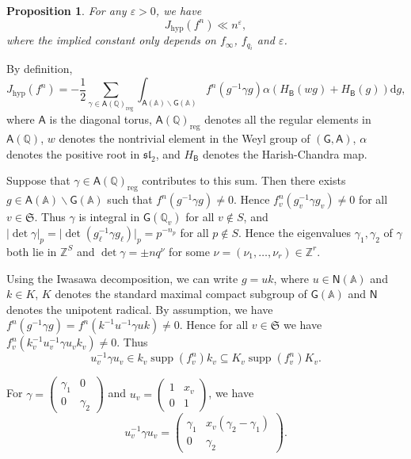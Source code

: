 \documentclass[10pt,oneside,reqno]{amsart}
\makeatletter
\newcommand\rmd{\mathrm{d}}
\renewcommand\AA{\mathbb{A}}
\newcommand\QQ{\mathbb{Q}}
\newcommand\ZZ{\mathbb{Z}}
\newcommand\mf[1]{\mathfrak{#1}}
\newcommand\A{\mathsf{A}}
\newcommand\B{\mathsf{B}}
\newcommand\G{\mathsf{G}}
\newcommand\N{\mathsf{N}}
\newcommand\bs{\backslash}
\DeclareMathOperator\supp{supp}
\newcommand\hyp{\mathrm{hyp}}
\newcommand\reg{\mathrm{reg}}
\theoremstyle{THEOREM}
\newtheorem{proposition}[theorem]{Proposition}
\theoremstyle{DEFINITION}
\theoremstyle{EXERCISE}
\numberwithin{equation}{section}
\renewenvironment{proof}[1][\proofname]{\par
  \vspace{-6pt}
  \pushQED{\qed}
  \normalfont \topsep6\p@\@plus6\p@\relax
  \trivlist
  \item[\hskip\labelsep\rmfamily\bfseries
    #1\@addpunct{:}]\ignorespaces
}{
  \popQED\endtrivlist\@endpefalse
  \vspace{-6pt}
}
\makeatother
\begin{document}
\begin{proposition}\label{prop:hypestimate}
For any $\varepsilon>0$, we have
\[
J_\hyp(f^n)\ll n^\varepsilon,
\]
where the implied constant only depends on $f_{\infty}$, $f_{q_i}$ and $\varepsilon$.
\end{proposition}
\begin{proof}
By definition, 
\[
J_\hyp(f^n)=-\frac{1}{2}\sum_{\gamma\in \A(\QQ)_{\reg}}\int_{\A(\AA)\bs \G(\AA)}f^n(g^{-1}\gamma g)\alpha(H_\B(wg)+H_\B(g))\rmd g,
\]
where $\A$ is the diagonal torus, $\A(\QQ)_\reg$ denotes all the regular elements in $\A(\QQ)$, $w$ denotes the nontrivial element in the Weyl group of $(\G,\A)$, $\alpha$ denotes the positive root in $\mf{sl}_2$, and $H_\B$ denotes the Harish-Chandra map. 

Suppose that $\gamma\in \A(\QQ)_\reg$ contributes to this sum. Then there exists $g\in \A(\AA)\bs\G(\AA)$ such that $f^n(g^{-1}\gamma g)\neq 0$. Hence $f_v^n(g_v^{-1}\gamma g_v)\neq 0$ for all $v\in \mf{S}$. Thus $\gamma$ is integral in $\G(\QQ_v)$ for all $v\notin S$, and $\mathopen{|}\det\gamma\mathclose{|}_p=\mathopen{|}\det(g_\ell^{-1}\gamma g_\ell)\mathclose{|}_p=p^{-n_p}$ for all $p\notin S$. Hence the eigenvalues $\gamma_1,\gamma_2$ of $\gamma$ both lie in $\ZZ^S$ and $\det\gamma=\pm nq^\nu$ for some $\nu=(\nu_1,\dots,\nu_r)\in \ZZ^r$. 

Using the Iwasawa decomposition, we can write $g=uk$, where $u\in \N(\AA)$ and $k\in K$, $K$ denotes the standard maximal compact subgroup of $\G(\AA)$ and $\N$ denotes the unipotent radical. By assumption, we have $f^n(g^{-1}\gamma g)=f^n(k^{-1}u^{-1}\gamma uk)\neq 0$. Hence for all $v\in \mf{S}$ we have $f_v^n(k_v^{-1}u_v^{-1}\gamma u_vk_v)\neq 0$. Thus 
\[
u_v^{-1}\gamma u_v\in k_v\supp(f_v^n)k_v\subseteq K_v\supp(f_v^n)K_v.
\]

For $\gamma=(\begin{smallmatrix} \gamma_1 & 0 \\ 0 & \gamma_2 \end{smallmatrix})$ and $u_v=(\begin{smallmatrix} 1 & x_v \\ 0 & 1 \end{smallmatrix})$, we have
\begin{equation}\label{eq:conjugateunipotent}
u_v^{-1}\gamma u_v=\begin{pmatrix}
           \gamma_1 & x_v(\gamma_2-\gamma_1) \\
           0 & \gamma_2
         \end{pmatrix}.
\end{equation}


\end{proof}
\end{document}
